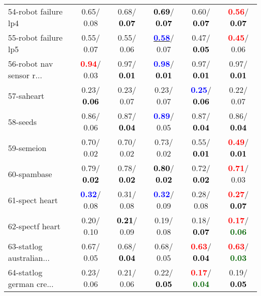 \begin{table}[h]
\begin{center}
\begin{tabular}{lc|c|c|c|c}
54-robot failure lp4 &   0.65/  0.08 &   0.68/\textcolor{black}{\textbf{  0.07}} & \textcolor{black}{\textbf{  0.69}}/\textcolor{black}{\textbf{  0.07}} &   0.60/\textcolor{black}{\textbf{  0.07}} & \textcolor{red}{\textbf{  0.56}}/\textcolor{black}{\textbf{  0.07}} \\
55-robot failure lp5 &   0.55/  0.07 &   0.55/  0.06 & \underline{\textcolor{blue}{\textbf{  0.58}}}/  0.07 &   0.47/\textcolor{black}{\textbf{  0.05}} & \textcolor{red}{\textbf{  0.45}}/  0.06 \\
56-robot nav sensor r... & \textcolor{red}{\textbf{  0.94}}/  0.03 &   0.97/\textcolor{black}{\textbf{  0.01}} & \textcolor{blue}{\textbf{  0.98}}/\textcolor{black}{\textbf{  0.01}} &   0.97/\textcolor{black}{\textbf{  0.01}} &   0.97/\textcolor{black}{\textbf{  0.01}} \\
57-saheart &   0.23/\textcolor{black}{\textbf{  0.06}} &   0.23/  0.07 &   0.23/  0.07 & \textcolor{blue}{\textbf{  0.25}}/\textcolor{black}{\textbf{  0.06}} &   0.22/  0.07 \\
58-seeds &   0.86/  0.06 &   0.87/\textcolor{black}{\textbf{  0.04}} & \textcolor{blue}{\textbf{  0.89}}/  0.05 &   0.87/\textcolor{black}{\textbf{  0.04}} &   0.86/\textcolor{black}{\textbf{  0.04}} \\
59-semeion &   0.70/  0.02 &   0.70/  0.02 &   0.73/  0.02 &   0.55/\textcolor{black}{\textbf{  0.01}} & \textcolor{red}{\textbf{  0.49}}/\textcolor{black}{\textbf{  0.01}} \\
60-spambase &   0.79/\textcolor{black}{\textbf{  0.02}} &   0.78/\textcolor{black}{\textbf{  0.02}} & \textcolor{black}{\textbf{  0.80}}/\textcolor{black}{\textbf{  0.02}} &   0.72/\textcolor{black}{\textbf{  0.02}} & \textcolor{red}{\textbf{  0.71}}/  0.03 \\ \hline
61-spect heart & \textcolor{blue}{\textbf{  0.32}}/  0.08 &   0.31/  0.08 & \textcolor{blue}{\textbf{  0.32}}/  0.09 &   0.28/  0.08 & \textcolor{red}{\textbf{  0.27}}/\textcolor{black}{\textbf{  0.07}} \\
62-spectf heart &   0.20/  0.10 & \textcolor{black}{\textbf{  0.21}}/  0.09 &   0.19/  0.08 &   0.18/\textcolor{black}{\textbf{  0.07}} & \textcolor{red}{\textbf{  0.17}}/\textcolor{darkgreen}{\textbf{  0.06}} \\
63-statlog australian... &   0.67/  0.05 &   0.68/\textcolor{black}{\textbf{  0.04}} &   0.68/  0.05 & \textcolor{red}{\textbf{  0.63}}/\textcolor{black}{\textbf{  0.04}} & \textcolor{red}{\textbf{  0.63}}/\textcolor{darkgreen}{\textbf{  0.03}} \\
64-statlog german cre... &   0.23/  0.06 &   0.21/  0.06 &   0.22/\textcolor{black}{\textbf{  0.05}} & \textcolor{red}{\textbf{  0.17}}/\textcolor{darkgreen}{\textbf{  0.04}} &   0.19/\textcolor{black}{\textbf{  0.05}} \\\end{tabular}\label{stratsALCKappa1bRFwRedux}
\end{center}
\end{table}
